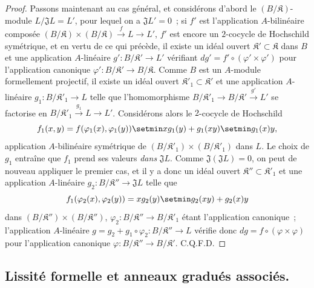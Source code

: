 \begin{proof}
Passons maintenant au cas général, et considérons d'abord le
$(B/\mathfrak K)$-module $L/\mathfrak JL=L'$, pour lequel on a
$\mathfrak JL'=0$~; si $f'$ est l'application $A$-bilinéaire composée
$(B/\mathfrak K)\times(B/\mathfrak K)\xrightarrow{f}L\to L'$, $f'$ est
encore un $2$-cocycle de Hochschild symétrique, et en vertu de ce qui précède,
il existe un idéal ouvert $\mathfrak K'\subset\mathfrak K$ dans $B$ et
une application $A$-linéaire $g':B/\mathfrak K'\to L'$ vérifiant
$dg'=f'\circ(\varphi'\times\varphi')$ pour l'application canonique
$\varphi':B/\mathfrak K'\to B/\mathfrak K$. Comme $B$ est un
$A$-module formellement projectif, il existe un idéal ouvert
$\mathfrak K'_1\subset\mathfrak K'$ et une application $A$-linéaire
$g_1:B/\mathfrak K'_1\to L$ telle que l'homomorphisme
$B/\mathfrak K'_1\to B/\mathfrak K'\xrightarrow{g'}L'$ se factorise en
$B/\mathfrak K'_1\xrightarrow{g_1}L\to L'$. Considérons alors le
$2$-cocycle de Hochschild
\[
  f_1(x,y)=f(\varphi_1(x),\varphi_1(y))\setmin xg_1(y)+g_1(xy)\setmin g_1(x)y,
\]
application $A$-bilinéaire symétrique de
$(B/\mathfrak K'_1)\times(B/\mathfrak K'_1)$ dans $L$. Le choix de
$g_1$ entraîne que $f_1$ prend ses valeurs \emph{dans} $\mathfrak JL$. Comme
$\mathfrak J(\mathfrak JL)=0$, on peut de nouveau appliquer le premier cas,
et il y a donc un idéal ouvert
$\mathfrak K''\subset\mathfrak K'_1$ et une application $A$-linéaire
$g_2:B/\mathfrak K''\to\mathfrak JL$ telle que
\[
  f_1(\varphi_2(x),\varphi_2(y))=xg_2(y)\setmin g_2(xy)+g_2(x)y
\]
dans $(B/\mathfrak K'')\times(B/\mathfrak K'')$,
$\varphi_2:B/\mathfrak K''\to B/\mathfrak K'_1$ étant l'application
canonique~; l'application $A$-linéaire
$g=g_2+g_1\circ\varphi_2:B/\mathfrak K''\to L$ vérifie donc
$dg=f\circ(\varphi\times\varphi)$ pour l'application canonique
$\varphi:B/\mathfrak K''\to B/\mathfrak K'$. C.Q.F.D.
\end{proof}


\subsection{Lissité formelle et anneaux gradués associés.}
\label{subsection:0.19.5-fr}

